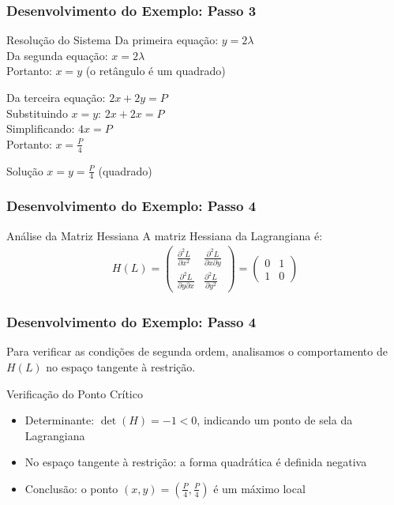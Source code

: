 \documentclass[11pt]{beamer}
\begin{document}
\begin{frame}
\frametitle{Desenvolvimento do Exemplo: Passo 3}
\large
\begin{block}{Resolução do Sistema}
Da primeira equação: $y = 2\lambda$ \\
Da segunda equação: $x = 2\lambda$ \\
\vspace{0.3cm}
Portanto: $x = y$ (o retângulo é um quadrado)
\vspace{0.3cm}

Da terceira equação: $2x + 2y = P$ \\
Substituindo $x = y$: $2x + 2x = P$ \\
Simplificando: $4x = P$ \\
Portanto: $x = \frac{P}{4}$
\end{block}

\begin{block}{Solução}
$x = y = \frac{P}{4}$ (quadrado)
\end{block}
\end{frame}

\begin{frame}
\frametitle{Desenvolvimento do Exemplo: Passo 4}
\large
\begin{block}{Análise da Matriz Hessiana}
A matriz Hessiana da Lagrangiana é:
\begin{align*}
H(L) = 
\begin{pmatrix}
\frac{\partial^2 L}{\partial x^2} & \frac{\partial^2 L}{\partial x \partial y} \\
\frac{\partial^2 L}{\partial y \partial x} & \frac{\partial^2 L}{\partial y^2}
\end{pmatrix} =
\begin{pmatrix}
0 & 1 \\
1 & 0
\end{pmatrix}
\end{align*}
\end{block}
\end{frame}


\begin{frame}
\frametitle{Desenvolvimento do Exemplo: Passo 4}
Para verificar as condições de segunda ordem, analisamos o comportamento de $H(L)$ no espaço tangente à restrição.

\begin{block}{Verificação do Ponto Crítico}
\begin{itemize}
\item Determinante: $\det(H) = -1 < 0$, indicando um ponto de sela da Lagrangiana
\item No espaço tangente à restrição: a forma quadrática é definida negativa
\item Conclusão: o ponto $(x,y) = (\frac{P}{4}, \frac{P}{4})$ é um máximo local
\end{itemize}
\end{block}
\end{frame}
\end{document}
